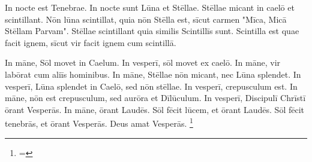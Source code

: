 In nocte est Tenebrae. In nocte sunt Lūna et Stēllae. Stēllae micant in caelō et scintillant. Nōn lūna scintillat, quia nōn Stēlla est, sīcut carmen "Mīca, Micā Stēllam Parvam". Stēllae scintillant quia similis Scintillīs sunt. Scintilla est quae facit ignem, sīcut vir facit ignem cum scintillā. 

In māne, Sōl movet in Caelum. In vesperī, sōl movet ex caelō. In māne, vir labōrat cum aliīs hominibus. In māne, Stēllae nōn micant, nec Lūna splendet. In vesperī, Lūna splendet in Caelō, sed nōn stēllae. In vesperī, crepusculum est. In māne, nōn est crepusculum, sed aurōra et Dīlūculum. In vesperī, Discipulī Chrīstī ōrant Vesperās. In māne, ōrant Laudēs. Sōl fēcit lūcem, et ōrant Laudēs. Sōl fēcit tenebrās, et ōrant Vesperās. Deus amat Vesperās.
\footnote{\textbf{} = }